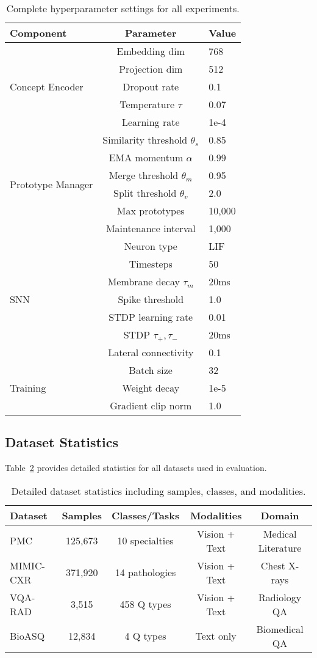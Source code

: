 \documentclass{article}
\begin{document}
\begin{table}[h]
\centering
\caption{Complete hyperparameter settings for all experiments.}
\label{tab:hyperparams}
\begin{tabular}{l|c|l}
\toprule
Component & Parameter & Value \\
\midrule
\multirow{5}{*}{Concept Encoder} & Embedding dim & 768 \\
& Projection dim & 512 \\
& Dropout rate & 0.1 \\
& Temperature $\tau$ & 0.07 \\
& Learning rate & 1e-4 \\
\midrule
\multirow{6}{*}{Prototype Manager} & Similarity threshold $\theta_s$ & 0.85 \\
& EMA momentum $\alpha$ & 0.99 \\
& Merge threshold $\theta_m$ & 0.95 \\
& Split threshold $\theta_v$ & 2.0 \\
& Max prototypes & 10,000 \\
& Maintenance interval & 1,000 \\
\midrule
\multirow{7}{*}{SNN} & Neuron type & LIF \\
& Timesteps & 50 \\
& Membrane decay $\tau_m$ & 20ms \\
& Spike threshold & 1.0 \\
& STDP learning rate & 0.01 \\
& STDP $\tau_+, \tau_-$ & 20ms \\
& Lateral connectivity & 0.1 \\
\midrule
\multirow{3}{*}{Training} & Batch size & 32 \\
& Weight decay & 1e-5 \\
& Gradient clip norm & 1.0 \\
\bottomrule
\end{tabular}
\end{table}

\subsection{Dataset Statistics}

Table~\ref{tab:dataset_stats} provides detailed statistics for all datasets used in evaluation.

\begin{table}[h]
\centering
\caption{Detailed dataset statistics including samples, classes, and modalities.}
\label{tab:dataset_stats}
\begin{tabular}{l|cccc}
\toprule
Dataset & Samples & Classes/Tasks & Modalities & Domain \\
\midrule
PMC & 125,673 & 10 specialties & Vision + Text & Medical Literature \\
MIMIC-CXR & 371,920 & 14 pathologies & Vision + Text & Chest X-rays \\
VQA-RAD & 3,515 & 458 Q types & Vision + Text & Radiology QA \\
BioASQ & 12,834 & 4 Q types & Text only & Biomedical QA \\
\bottomrule
\end{tabular}
\end{table}
\end{document}
